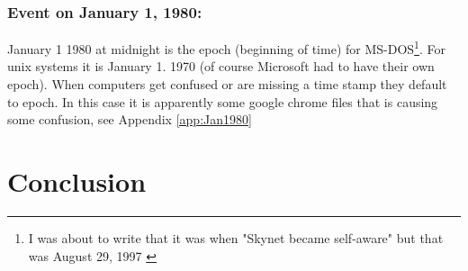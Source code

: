 \documentclass[
	letterpaper, %
	10pt, %
	unnumberedsections, %
	twoside, %
]{APAAssignment}
\begin{document}
\subsubsection{Event on January 1, 1980:}
January 1 1980 at midnight is the epoch (beginning of time) for MS-DOS\footnote{I was about to write that it was when "Skynet became self-aware" but that was August 29, 1997 \cite{enwiki:Terminator}}. For unix systems it is January 1. 1970 (of course Microsoft had to have their own epoch). When computers get confused or are missing a time stamp they default to epoch. In this case it is apparently some google chrome files that is causing some confusion, see Appendix \ref{app:Jan1980}


%
%










\section{Conclusion}

\clearpage
\printbibliography %




%


\clearpage
\end{document}
